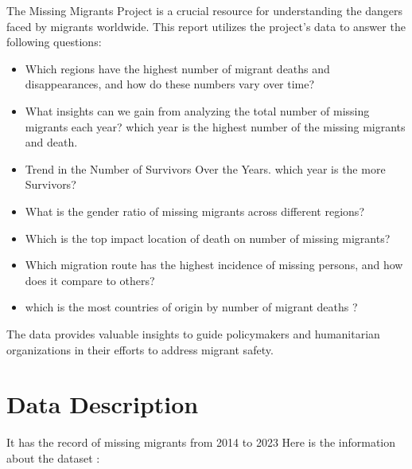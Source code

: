 \documentclass{article}
\begin{document}
The Missing Migrants Project is a crucial resource for understanding the dangers faced by migrants worldwide. This report utilizes the project's data to answer the following questions:
\begin{itemize}
    \item Which regions have the highest number of migrant deaths and disappearances, and how do these numbers vary over time?
    \item What insights can we gain from analyzing the total number of missing migrants each year? which year is the highest number of the missing migrants and death.

    \item Trend in the Number of Survivors Over the Years. which year is the more Survivors?
    \item What is the gender ratio of missing migrants across different regions?
    \item Which is the top  impact location of death on number of missing migrants?
    \item Which migration route has the highest incidence of missing persons, and how does it compare to others?
    \item which is the most countries of origin by number of migrant deaths  ?
\end{itemize}

The data provides valuable insights  to guide policymakers and humanitarian organizations in their efforts to address migrant safety.

\section{Data Description}
It has the record of missing migrants from 2014 to 2023
Here is the information about the dataset :
\end{document}
